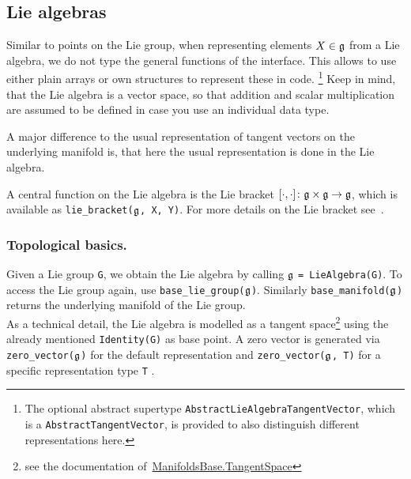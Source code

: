 \documentclass{juliacon}
\begin{document}
\subsection{Lie algebras}

Similar to points on the Lie group, when representing elements $X \in \frak g$ from a Lie algebra, we do not type the general functions of the interface.
This allows to use either plain arrays or own structures to represent these in code.
\footnote{The optional abstract supertype \texttt{AbstractLieAlgebraTangentVector}, which is a \texttt{AbstractTangentVector}, is provided to also distinguish different representations here.}
Keep in mind, that the Lie algebra is a vector space, so that addition and scalar multiplication are assumed to be defined in case you use an individual data type.

A major difference to the usual representation of tangent vectors on the underlying manifold is, that here the usual representation is done in the Lie algebra.

A central function on the Lie algebra is the Lie bracket $[\cdot, \cdot]\colon \frak g \times \frak g \to \frak g$, which is available as \verb|lie_bracket(|$\frak g$\verb|, X, Y)|.
For more details on the Lie bracket see~\cite[Ch.~5]{HilgertNeeb:2012}.

\subsubsection*{Topological basics.}
Given a Lie group \verb|G|, we obtain the Lie algebra by calling $\frak g$ \verb|= LieAlgebra(G)|.
To access the Lie group again, use \verb|base_lie_group(|$\frak g$\verb|)|. Similarly \verb|base_manifold(|$\frak g$\verb|)| returns the underlying manifold of the Lie group.\\
As a technical detail, the Lie algebra is modelled as a tangent space\footnote{see the documentation of~\href{https://juliamanifolds.github.io/ManifoldsBase.jl/stable/metamanifolds/\#ManifoldsBase.TangentSpace}{ManifoldsBase.TangentSpace}} using the already mentioned \verb|Identity(G)| as base point.
A zero vector is generated via \verb|zero_vector(|$\frak g$\verb|)| for the default representation and \verb|zero_vector(|$\frak g$\verb|, T)| for a specific representation type \verb|T|%
.
\end{document}
